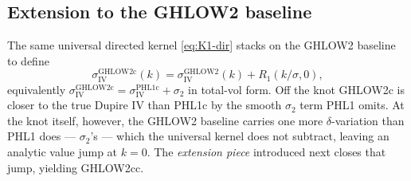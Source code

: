 \documentclass[11pt]{article}
\newcommand{\siv}{\sigma_{\mathrm{IV}}}
\begin{document}
\subsection{Extension to the GHLOW2 baseline}\label{sec:extension}

The same universal directed kernel \eqref{eq:K1-dir} stacks on the
GHLOW2 baseline to define
\begin{equation}
\siv^{\mathrm{GHLOW2c}}(k)=\siv^{\mathrm{GHLOW2}}(k)+R_{1}(k/\sigma, 0),
\label{eq:ghlow2c}
\end{equation}
equivalently $\siv^{\mathrm{GHLOW2c}}=\siv^{\mathrm{PHL1c}}+\sigma_2$
in total-vol form. Off the knot GHLOW2c is closer to the true Dupire
IV than PHL1c by the smooth $\sigma_2$ term PHL1 omits. At the knot
itself, however, the GHLOW2 baseline carries one more $\delta$-variation
than PHL1 does --- $\sigma_2$'s --- which the universal kernel does not
subtract, leaving an analytic value jump at $k=0$. The
\emph{extension piece} introduced next closes that jump, yielding
GHLOW2cc.
\end{document}
